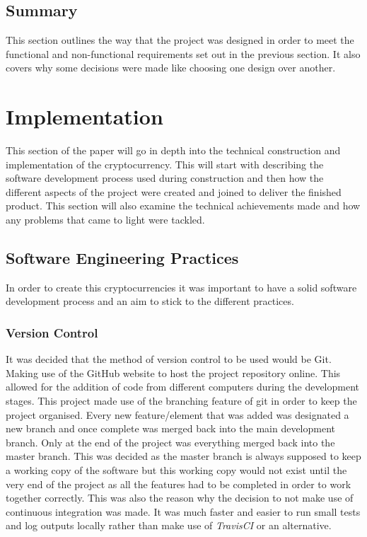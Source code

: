 \documentclass{l4proj}
\begin{document}
\section{Summary}
This section outlines the way that the project was designed in order to meet the functional and non-functional 
requirements set out in the previous section. It also covers why some decisions were made like choosing one design 
over another.

\chapter{Implementation}
This section of the paper will go in depth into the technical construction and implementation of the cryptocurrency.
This will start with describing the software development process used during construction and then how the different
aspects of the project were created and joined to deliver the finished product. This section will also examine the 
technical achievements made and how any problems that came to light were tackled.


\section{Software Engineering Practices}
In order to create this cryptocurrencies it was important to have a solid software development process and an
aim to stick to the different practices.

\subsection{Version Control}
It was decided that the method of version control to be used would be Git. Making use of the GitHub website to 
host the project repository online. This allowed for the addition of code from different computers during the
development stages. This project made use of the branching feature of git in order to keep the project organised.
Every new feature/element that was added was designated a new branch and once complete was merged back into the
main development branch. Only at the end of the project was everything merged back into the master branch. This
was decided as the master branch is always supposed to keep a working copy of the software but this working copy
would not exist until the very end of the project as all the features had to be completed in order to work together
correctly. This was also the reason why the decision to not make use of continuous integration was made. It was
much faster and easier to run small tests and log outputs locally rather than make use of \textit{TravisCI} or an 
alternative.
\end{document}
